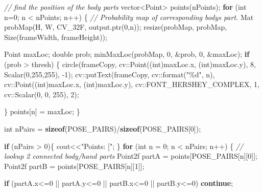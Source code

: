 \documentclass[
  12pt,
  a4paper,
]{article}
\newenvironment{Shaded}{}{}
\newcommand{\CommentTok}[1]{\textcolor[rgb]{0.38,0.63,0.69}{\textit{#1}}}
\newcommand{\ControlFlowTok}[1]{\textcolor[rgb]{0.00,0.44,0.13}{\textbf{#1}}}
\newcommand{\DataTypeTok}[1]{\textcolor[rgb]{0.56,0.13,0.00}{#1}}
\newcommand{\DecValTok}[1]{\textcolor[rgb]{0.25,0.63,0.44}{#1}}
\newcommand{\KeywordTok}[1]{\textcolor[rgb]{0.00,0.44,0.13}{\textbf{#1}}}
\newcommand{\NormalTok}[1]{#1}
\newcommand{\SpecialCharTok}[1]{\textcolor[rgb]{0.25,0.44,0.63}{#1}}
\newcommand{\StringTok}[1]{\textcolor[rgb]{0.25,0.44,0.63}{#1}}
\begin{document}
\begin{Shaded}
\begin{Highlighting}[numbers=left,,]
    \CommentTok{// find the position of the body parts}
\NormalTok{    vector\textless{}Point\textgreater{} points(nPoints);}
    \ControlFlowTok{for}\NormalTok{ (}\DataTypeTok{int}\NormalTok{ n=}\DecValTok{0}\NormalTok{; n \textless{} nPoints; n++)}
\NormalTok{    \{}
        \CommentTok{// Probability map of corresponding body\textquotesingle{}s part.}
\NormalTok{        Mat probMap(H, W, CV\_32F, output.ptr(}\DecValTok{0}\NormalTok{,n));}
\NormalTok{        resize(probMap, probMap, Size(frameWidth, frameHeight));}

\NormalTok{        Point maxLoc;}
        \DataTypeTok{double}\NormalTok{ prob;}
\NormalTok{        minMaxLoc(probMap, }\DecValTok{0}\NormalTok{, \&prob, }\DecValTok{0}\NormalTok{, \&maxLoc);}
        \ControlFlowTok{if}\NormalTok{ (prob \textgreater{} thresh)}
\NormalTok{        \{}
\NormalTok{            circle(frameCopy, cv::Point((}\DataTypeTok{int}\NormalTok{)maxLoc.x, (}\DataTypeTok{int}\NormalTok{)maxLoc.y), }\DecValTok{8}\NormalTok{, Scalar(}\DecValTok{0}\NormalTok{,}\DecValTok{255}\NormalTok{,}\DecValTok{255}\NormalTok{), {-}}\DecValTok{1}\NormalTok{);}
\NormalTok{            cv::putText(frameCopy, cv::format(}\StringTok{"}\SpecialCharTok{\%d}\StringTok{"}\NormalTok{, n), cv::Point((}\DataTypeTok{int}\NormalTok{)maxLoc.x, (}\DataTypeTok{int}\NormalTok{)maxLoc.y), cv::FONT\_HERSHEY\_COMPLEX, }\DecValTok{1}\NormalTok{, cv::Scalar(}\DecValTok{0}\NormalTok{, }\DecValTok{0}\NormalTok{, }\DecValTok{255}\NormalTok{), }\DecValTok{2}\NormalTok{);}

\NormalTok{        \}}
\NormalTok{        points[n] = maxLoc;}
\NormalTok{    \}}

    \DataTypeTok{int}\NormalTok{ nPairs = }\KeywordTok{sizeof}\NormalTok{(POSE\_PAIRS)/}\KeywordTok{sizeof}\NormalTok{(POSE\_PAIRS[}\DecValTok{0}\NormalTok{]);}

    \ControlFlowTok{if}\NormalTok{ (nPairs \textgreater{} }\DecValTok{0}\NormalTok{)\{}
\NormalTok{        cout\textless{}\textless{}}\StringTok{"Points: ["}\NormalTok{;}
\NormalTok{    \}}
    \ControlFlowTok{for}\NormalTok{ (}\DataTypeTok{int}\NormalTok{ n = }\DecValTok{0}\NormalTok{; n \textless{} nPairs; n++)}
\NormalTok{    \{}
        \CommentTok{// lookup 2 connected body/hand parts}
\NormalTok{        Point2f partA = points[POSE\_PAIRS[n][}\DecValTok{0}\NormalTok{]];}
\NormalTok{        Point2f partB = points[POSE\_PAIRS[n][}\DecValTok{1}\NormalTok{]];}

        \ControlFlowTok{if}\NormalTok{ (partA.x\textless{}=}\DecValTok{0}\NormalTok{ || partA.y\textless{}=}\DecValTok{0}\NormalTok{ || partB.x\textless{}=}\DecValTok{0}\NormalTok{ || partB.y\textless{}=}\DecValTok{0}\NormalTok{)}
            \ControlFlowTok{continue}\NormalTok{;}


\end{Highlighting}
\end{Shaded}
\end{document}
